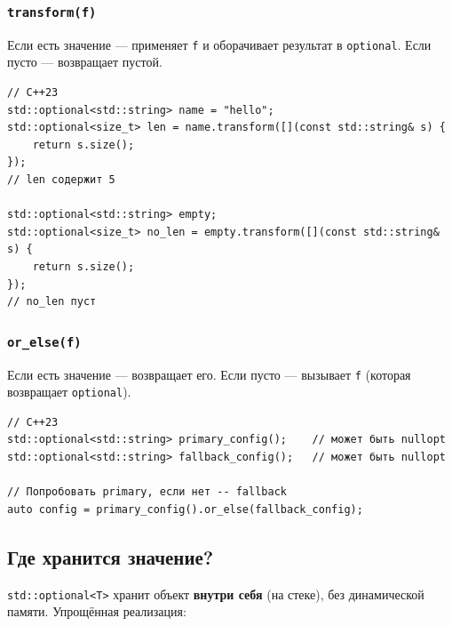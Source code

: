 \documentclass[a4paper,12pt]{article}
\begin{document}
\subsubsection{\texttt{transform(f)}}

Если есть значение --- применяет \texttt{f} и оборачивает результат в \texttt{optional}.
Если пусто --- возвращает пустой.

\begin{lstlisting}
// C++23
std::optional<std::string> name = "hello";
std::optional<size_t> len = name.transform([](const std::string& s) {
    return s.size();
});
// len содержит 5

std::optional<std::string> empty;
std::optional<size_t> no_len = empty.transform([](const std::string& s) {
    return s.size();
});
// no_len пуст
\end{lstlisting}

\subsubsection{\texttt{or\_else(f)}}

Если есть значение --- возвращает его. Если пусто --- вызывает \texttt{f}
(которая возвращает \texttt{optional}).

\begin{lstlisting}
// C++23
std::optional<std::string> primary_config();    // может быть nullopt
std::optional<std::string> fallback_config();   // может быть nullopt

// Попробовать primary, если нет -- fallback
auto config = primary_config().or_else(fallback_config);
\end{lstlisting}

\subsection{Где хранится значение?}

\texttt{std::optional<T>} хранит объект \textbf{внутри себя} (на стеке),
без динамической памяти. Упрощённая реализация:
\end{document}
